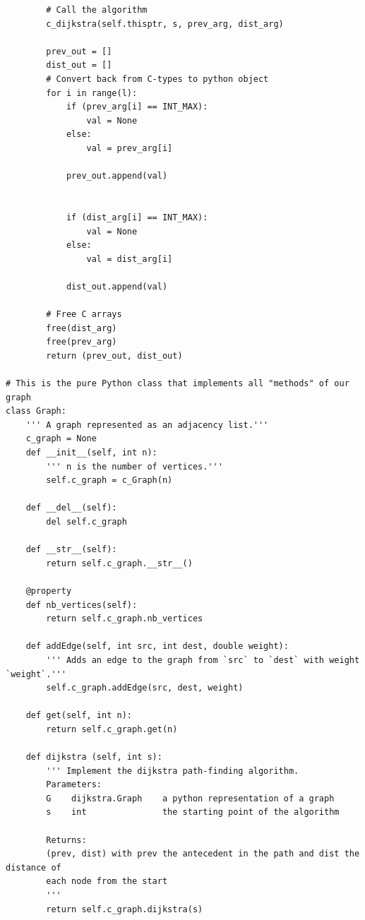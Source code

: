 \documentclass{article}
\begin{document}
\begin{verbatim}
        # Call the algorithm
        c_dijkstra(self.thisptr, s, prev_arg, dist_arg)

        prev_out = []
        dist_out = []
        # Convert back from C-types to python object
        for i in range(l):
            if (prev_arg[i] == INT_MAX):
                val = None
            else:
                val = prev_arg[i]

            prev_out.append(val)


            if (dist_arg[i] == INT_MAX):
                val = None
            else:
                val = dist_arg[i]

            dist_out.append(val)

        # Free C arrays
        free(dist_arg)
        free(prev_arg)
        return (prev_out, dist_out)

# This is the pure Python class that implements all "methods" of our graph
class Graph:
    ''' A graph represented as an adjacency list.'''
    c_graph = None
    def __init__(self, int n):
        ''' n is the number of vertices.'''
        self.c_graph = c_Graph(n)

    def __del__(self):
        del self.c_graph

    def __str__(self):
        return self.c_graph.__str__()

    @property
    def nb_vertices(self):
        return self.c_graph.nb_vertices

    def addEdge(self, int src, int dest, double weight):
        ''' Adds an edge to the graph from `src` to `dest` with weight `weight`.'''
        self.c_graph.addEdge(src, dest, weight)

    def get(self, int n):
        return self.c_graph.get(n)

    def dijkstra (self, int s):
        ''' Implement the dijkstra path-finding algorithm.
        Parameters:
        G    dijkstra.Graph    a python representation of a graph
        s    int               the starting point of the algorithm

        Returns:
        (prev, dist) with prev the antecedent in the path and dist the distance of
        each node from the start
        '''
        return self.c_graph.dijkstra(s)
\end{verbatim}

\section*{}
\end{document}
